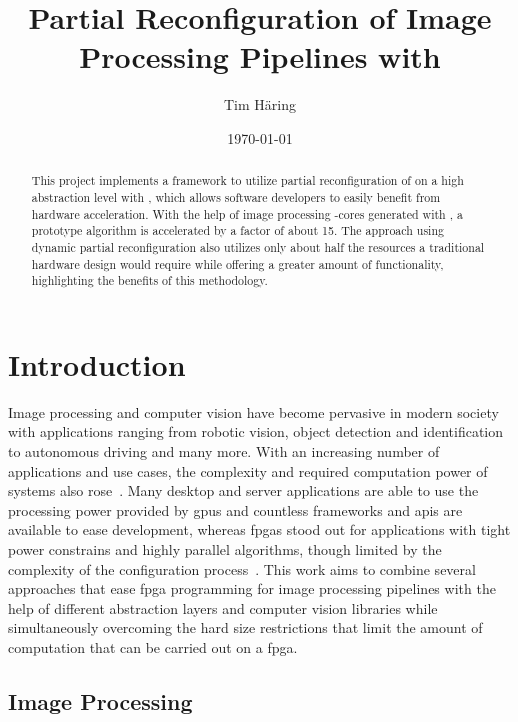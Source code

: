 \documentclass{scrartcl}
\title{Partial Reconfiguration of \glsentryshort{fpga} Image Processing
Pipelines with \glsentryshort{pynq}}
\author{Tim Häring}
\date{\today}
\begin{document}
\maketitle


\begin{abstract}
This project implements a framework to utilize partial reconfiguration of
 on a high abstraction level with ,
which allows software developers to easily benefit from hardware acceleration.
With the help of image processing -cores generated with
, a prototype algorithm is accelerated by a factor of about
15. The approach using dynamic partial reconfiguration also utilizes only about
half the resources a traditional hardware design would require while offering a
greater amount of functionality, highlighting the benefits of this methodology.
\end{abstract}


\section{Introduction}

Image processing and computer vision have become pervasive in modern society
with applications ranging from robotic vision, object detection and
identification to autonomous driving and many more. With an increasing number of
applications and use cases, the complexity and required computation power of
systems also rose~\cite{kalb2016tulipp}. Many desktop and server applications
are able to use the processing power provided by \glspl{gpu} and countless
frameworks and \glspl{api} are available to ease development, whereas
\glspl{fpga} stood out for applications with tight power constrains and highly
parallel algorithms, though limited by the complexity of the configuration
process~\cite{kalms2017exploration}. This work aims to combine several
approaches that ease \gls{fpga} programming for image processing pipelines with
the help of different abstraction layers and computer vision libraries while
simultaneously overcoming the hard size restrictions that limit the amount of
computation that can be carried out on a \gls{fpga}.


\subsection{Image Processing}
\end{document}
